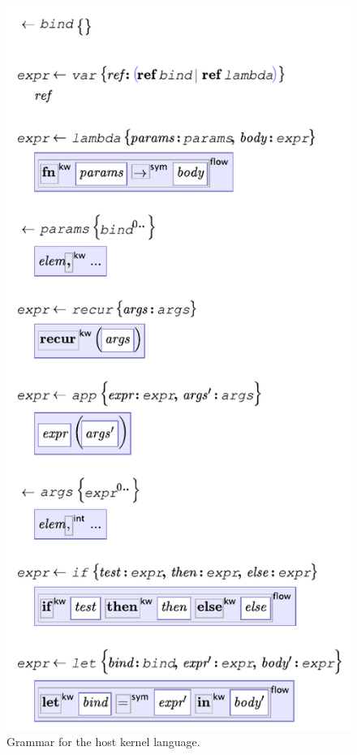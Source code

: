 \begin{figure}
\begin{minipage}[t]{0.48\linewidth}
\begin{center}
  \end{center}
  \end{minipage}
  \begin{minipage}[t]{0.48\linewidth}
  \vspace{0pt}  %
  \begin{center}
  \includegraphics[scale=0.65]{src/image/kernel2.pdf}
  \end{center}
  \end{minipage}
  

  \caption{\label{fig-kernel} Grammar for the host kernel language.}
\end{figure}

